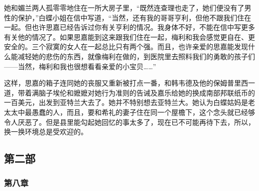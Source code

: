 \par 她和媚兰两人孤零零地住在一所大房子里，“既然连查理也走了，她们便没有了男性的保护，”白蝶小姐在信中写道，“当然，还有我的哥哥亨利，但他不跟我们住在一起。但也许思嘉已经告诉过你有关亨利的情况。我身体不好，不能在信中写更多有关他的情况了。如果思嘉能到这来跟我们住在一起，梅利和我会感觉更自在、更安全的。三个寂寞的女人在一起总比只有两个强。而且，也许亲爱的思嘉能发现什么能减轻她的悲伤的东西，就像梅利在做的，到医院里去照料我们的勇敢的孩子们——当然，梅利和我也很想看看亲爱的小宝贝……”
\par 这样，思嘉的箱子连同她的丧服又重新被打点一番，和韩韦德及他的保姆普里西一道，带着满脑子埃伦和嬷嬷对她行为准则的告诫及嘉乐给她的换成南部邦联纸币的一百美元，出发到亚特兰大去了。她并不特别想去亚特兰大。她认为白蝶姑妈是老太太中最愚蠢的人，而且，要和希礼的妻子住在同一个屋檐下，这个念头就已经够令人厌恶了。但是县里能勾起她回忆的事太多了，现在已不可能再待下去，所以，换一换环境总是受欢迎的。



\subsection{第二部}



\subsubsection{第八章}

